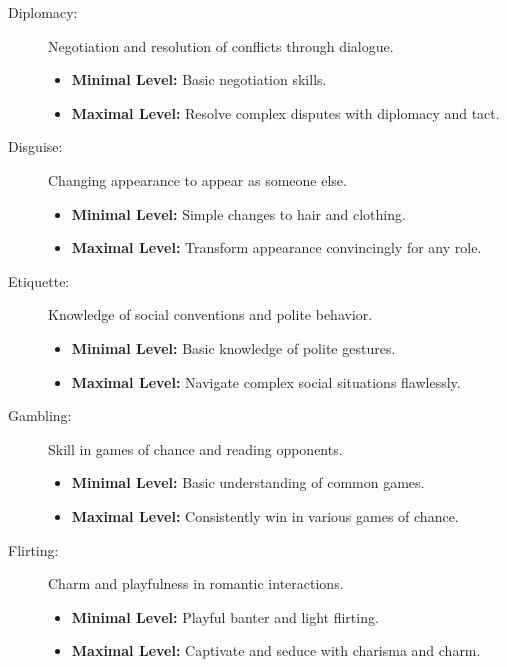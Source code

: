 \documentclass[12pt]{book}  %
\begin{document}
\begin{description}
    \item[Diplomacy:] Negotiation and resolution of conflicts through dialogue.
        \begin{itemize}
            \item \textbf{Minimal Level:} Basic negotiation skills.
            \item \textbf{Maximal Level:} Resolve complex disputes with diplomacy and tact.
        \end{itemize}

    \item[Disguise:] Changing appearance to appear as someone else.
        \begin{itemize}
            \item \textbf{Minimal Level:} Simple changes to hair and clothing.
            \item \textbf{Maximal Level:} Transform appearance convincingly for any role.
        \end{itemize}

    \item[Etiquette:] Knowledge of social conventions and polite behavior.
        \begin{itemize}
            \item \textbf{Minimal Level:} Basic knowledge of polite gestures.
            \item \textbf{Maximal Level:} Navigate complex social situations flawlessly.
        \end{itemize}

    \item[Gambling:] Skill in games of chance and reading opponents.
        \begin{itemize}
            \item \textbf{Minimal Level:} Basic understanding of common games.
            \item \textbf{Maximal Level:} Consistently win in various games of chance.
        \end{itemize}

    \item[Flirting:] Charm and playfulness in romantic interactions.
        \begin{itemize}
            \item \textbf{Minimal Level:} Playful banter and light flirting.
            \item \textbf{Maximal Level:} Captivate and seduce with charisma and charm.
        \end{itemize}


\end{description}
\end{document}
